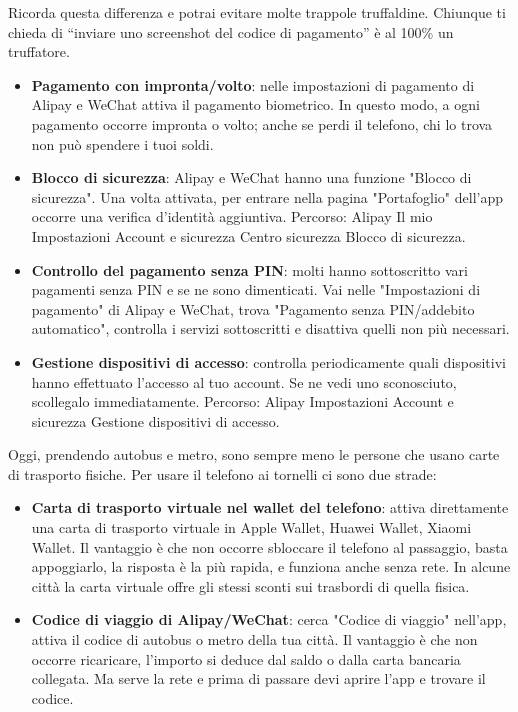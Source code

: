 Ricorda questa differenza e potrai evitare molte trappole truffaldine. Chiunque ti chieda di “inviare uno screenshot del codice di pagamento” è al 100\% un truffatore.


\begin{itemize}
  \item \textbf{Pagamento con impronta/volto}: nelle impostazioni di pagamento di Alipay e WeChat attiva il pagamento biometrico. In questo modo, a ogni pagamento occorre impronta o volto; anche se perdi il telefono, chi lo trova non può spendere i tuoi soldi.
  \item \textbf{Blocco di sicurezza}: Alipay e WeChat hanno una funzione "Blocco di sicurezza". Una volta attivata, per entrare nella pagina "Portafoglio" dell'app occorre una verifica d'identità aggiuntiva. Percorso: Alipay Il mio Impostazioni Account e sicurezza Centro sicurezza Blocco di sicurezza.
  \item \textbf{Controllo del pagamento senza PIN}: molti hanno sottoscritto vari pagamenti senza PIN e se ne sono dimenticati. Vai nelle "Impostazioni di pagamento" di Alipay e WeChat, trova "Pagamento senza PIN/addebito automatico", controlla i servizi sottoscritti e disattiva quelli non più necessari.
  \item \textbf{Gestione dispositivi di accesso}: controlla periodicamente quali dispositivi hanno effettuato l'accesso al tuo account. Se ne vedi uno sconosciuto, scollegalo immediatamente. Percorso: Alipay Impostazioni Account e sicurezza Gestione dispositivi di accesso.
\end{itemize}


Oggi, prendendo autobus e metro, sono sempre meno le persone che usano carte di trasporto fisiche. Per usare il telefono ai tornelli ci sono due strade:

\begin{itemize}
  \item \textbf{Carta di trasporto virtuale nel wallet del telefono}: attiva direttamente una carta di trasporto virtuale in Apple Wallet, Huawei Wallet, Xiaomi Wallet. Il vantaggio è che non occorre sbloccare il telefono al passaggio, basta appoggiarlo, la risposta è la più rapida, e funziona anche senza rete. In alcune città la carta virtuale offre gli stessi sconti sui trasbordi di quella fisica.
  \item \textbf{Codice di viaggio di Alipay/WeChat}: cerca "Codice di viaggio" nell'app, attiva il codice di autobus o metro della tua città. Il vantaggio è che non occorre ricaricare, l'importo si deduce dal saldo o dalla carta bancaria collegata. Ma serve la rete e prima di passare devi aprire l'app e trovare il codice.
\end{itemize}

